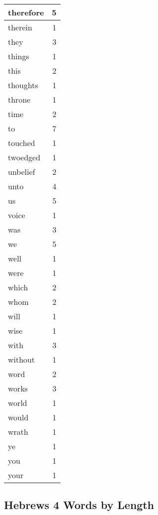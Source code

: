 \begin{center}
\begin{longtable}{l|r}
therefore & 5\\ \hline 
therein & 1\\ \hline 
they & 3\\ \hline 
things & 1\\ \hline 
this & 2\\ \hline 
thoughts & 1\\ \hline 
throne & 1\\ \hline 
time & 2\\ \hline 
to & 7\\ \hline 
touched & 1\\ \hline 
twoedged & 1\\ \hline 
unbelief & 2\\ \hline 
unto & 4\\ \hline 
us & 5\\ \hline 
voice & 1\\ \hline 
was & 3\\ \hline 
we & 5\\ \hline 
well & 1\\ \hline 
were & 1\\ \hline 
which & 2\\ \hline 
whom & 2\\ \hline 
will & 1\\ \hline 
wise & 1\\ \hline 
with & 3\\ \hline 
without & 1\\ \hline 
word & 2\\ \hline 
works & 3\\ \hline 
world & 1\\ \hline 
would & 1\\ \hline 
wrath & 1\\ \hline 
ye & 1\\ \hline 
you & 1\\ \hline 
your & 1\\ \hline 
\end{longtable}
\end{center}





\subsection{Hebrews 4 Words by Length}


\normalsize
 
